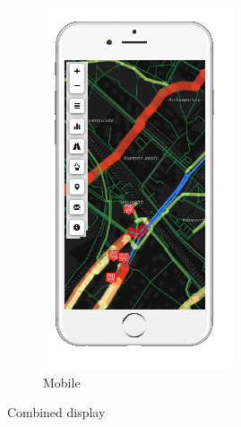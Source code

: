 \begin{figure}[ht]
\begin{subfigure}[b]{0.2\textwidth}
    \includegraphics[width=\textwidth]
      {img/c03-merge/png/mobile-basemap-merge.png}
    \caption{Mobile}
  \end{subfigure}
  \caption{Combined display}
\end{figure}
